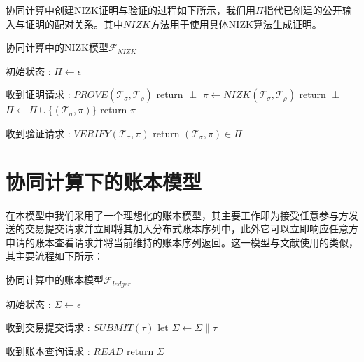 协同计算中创建NIZK证明与验证的过程如下所示，我们用$\Pi$指代已创建的公开输入与证明的配对关系。其中$NIZK$方法用于使用具体NIZK算法生成证明。

\begin{breakablealgorithm}
    \caption{协同计算中的NIZK模型$\mathcal{F}_{NIZK}$}
    \label{alg:ch3-3}
    \begin{algorithmic} 
        \item [初始状态]: $\Pi \leftarrow \epsilon$
        \item [收到证明请求]: $PROVE(\mathcal{T}_\sigma, \mathcal{T}_\rho)$
        \STATE return $\perp$
        \ENDIF
        \STATE $\pi \leftarrow NIZK(\mathcal{T}_\sigma, \mathcal{T}_\rho)$
        \IF {$\pi = \perp \vee (\cdot, \pi) \in \Pi$}
        \STATE return $\perp$
        \ENDIF
        \STATE $\Pi \leftarrow \Pi \cup \{(\mathcal{T}_\sigma, \pi)\}$
        \STATE return $\pi$
        
        \item [收到验证请求]: $VERIFY(\mathcal{T}_\sigma, \pi)$
        \STATE return $(\mathcal{T}_\sigma, \pi) \in \Pi$
    \end{algorithmic}
\end{breakablealgorithm}

\section{协同计算下的账本模型}
在本模型中我们采用了一个理想化的账本模型，其主要工作即为接受任意参与方发送的交易提交请求并立即将其加入分布式账本序列中，此外它可以立即响应任意方申请的账本查看请求并将当前维持的账本序列返回。这一模型与文献\cite{cryptoeprint:2015/574}使用的类似，其主要流程如下所示：
\begin{breakablealgorithm}
    \caption{协同计算中的账本模型$\mathcal{F}_{ledger}$}
    \label{alg:ch3-4}
    \begin{algorithmic} 
        \item [初始状态]: $\Sigma \leftarrow \epsilon$
        \item [收到交易提交请求]: $SUBMIT(\tau)$
        \STATE let $\Sigma \leftarrow \Sigma \parallel \tau$
        
        \item [收到账本查询请求]: $READ$
        \STATE return $\Sigma$
    \end{algorithmic}
\end{breakablealgorithm}


